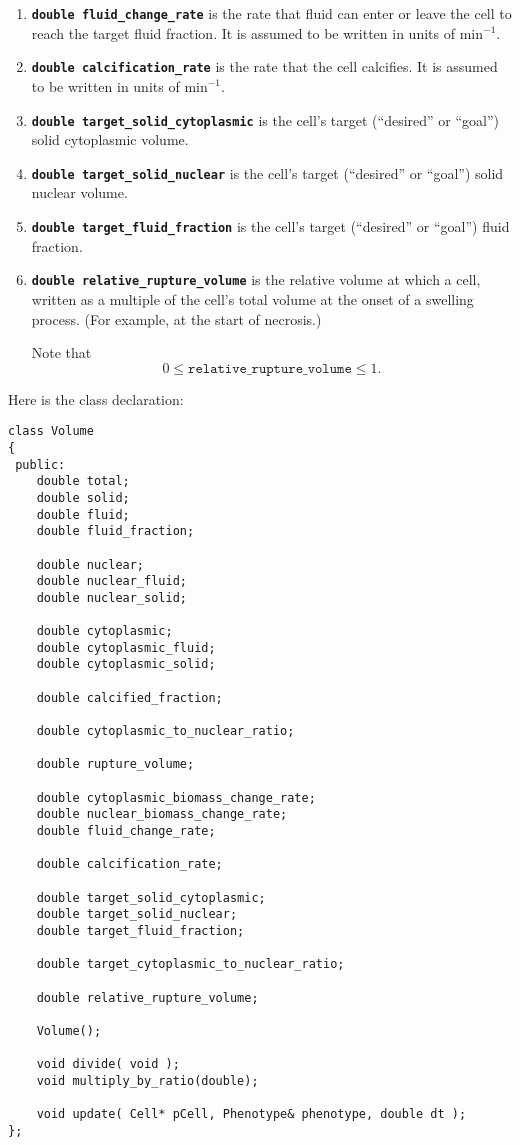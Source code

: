 \documentclass[12pt]{article}
\newcommand{\beq}{\begin{equation}}
\newcommand{\eeq}{\end{equation}}
\newcommand{\smallcode}[1]{\textbf{\texttt{#1}}}
\begin{document}
\begin{enumerate}
\item 
\smallcode{double fluid\_change\_rate} is the rate that fluid can enter or leave the cell to reach the target 
fluid fraction. It is assumed to be written in units of $\textrm{min}^{-1}$.

\item 
\smallcode{double calcification\_rate} is the rate that the cell calcifies. It is assumed to be written in units of $\textrm{min}^{-1}$.

\item 
\smallcode{double target\_solid\_cytoplasmic} is the cell's target (``desired'' or ``goal'') solid cytoplasmic volume. 

\item 
\smallcode{double target\_solid\_nuclear} is the cell's target (``desired'' or ``goal'') solid nuclear volume. 

\item 
\smallcode{double target\_fluid\_fraction} is the cell's target (``desired'' or ``goal'') fluid fraction. 

\item 
\smallcode{double relative\_rupture\_volume} is the relative volume 
at which a cell, written as a 
multiple of the cell's total volume at the onset of a swelling process. 
(For example, at the start of necrosis.) 

Note that 
\beq
0 \le \texttt{relative\_rupture\_volume} \le 1.
\eeq 

\end{enumerate}

Here is the class declaration:
\begin{verbatim}
class Volume
{
 public:
    double total;
    double solid;
    double fluid;
    double fluid_fraction; 
    
    double nuclear;
    double nuclear_fluid;
    double nuclear_solid; 

    double cytoplasmic;
    double cytoplasmic_fluid; 
    double cytoplasmic_solid; 
    
    double calcified_fraction;
    
    double cytoplasmic_to_nuclear_ratio;
    
    double rupture_volume;  
    
    double cytoplasmic_biomass_change_rate; 
    double nuclear_biomass_change_rate; 
    double fluid_change_rate;

    double calcification_rate; 
    
    double target_solid_cytoplasmic;
    double target_solid_nuclear;
    double target_fluid_fraction;
    
    double target_cytoplasmic_to_nuclear_ratio;

    double relative_rupture_volume; 

    Volume();      
    
    void divide( void );      
    void multiply_by_ratio(double);      
    
    void update( Cell* pCell, Phenotype& phenotype, double dt );      
};
\end{verbatim}
\end{document}
